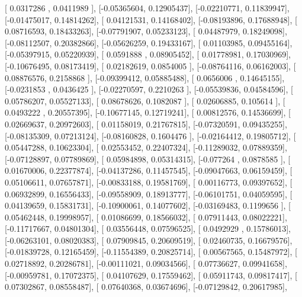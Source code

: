 \documentclass{article}
\begin{document}
       [ 0.0317286 ,  0.0411989 ],
       [-0.05365604,  0.12905437],
       [-0.02210771,  0.11839947],
       [-0.01475017,  0.14814262],
       [ 0.04121531,  0.14168402],
       [-0.08193896,  0.17688948],
       [ 0.08716593,  0.18433263],
       [-0.07791907,  0.05233123],
       [ 0.04487979,  0.18249098],
       [-0.08112507,  0.20382866],
       [-0.05626259,  0.19433167],
       [ 0.01103985,  0.09455164],
       [-0.05397915,  0.05220939],
       [ 0.0591888 ,  0.08905452],
       [ 0.01778981,  0.17030969],
       [-0.10676495,  0.08173419],
       [ 0.02182619,  0.0854005 ],
       [-0.08764116,  0.06162003],
       [ 0.08876576,  0.2158868 ],
       [-0.09399412,  0.05885488],
       [ 0.0656006 ,  0.14645155],
       [-0.0231853 ,  0.0436425 ],
       [-0.02270597,  0.2210263 ],
       [-0.05539836,  0.04584596],
       [ 0.05786207,  0.05527133],
       [ 0.08678626,  0.1082087 ],
       [ 0.02606885,  0.105614  ],
       [ 0.0493222 ,  0.20557395],
       [-0.10677145,  0.12719241],
       [ 0.00812576,  0.14536699],
       [ 0.02669637,  0.20972603],
       [ 0.01158019,  0.21767815],
       [-0.07320591,  0.09435255],
       [-0.08135309,  0.07213124],
       [-0.08160828,  0.1604476 ],
       [-0.02164412,  0.19805712],
       [ 0.05447288,  0.10623304],
       [ 0.02553452,  0.22407324],
       [-0.11289032,  0.07889359],
       [-0.07128897,  0.07789869],
       [ 0.05984898,  0.05314315],
       [-0.077264  ,  0.0878585 ],
       [ 0.01670006,  0.22377874],
       [-0.04137286,  0.11457545],
       [-0.09047663,  0.06159459],
       [ 0.05106611,  0.07657871],
       [-0.00833188,  0.19581769],
       [ 0.00116773,  0.09397652],
       [ 0.06932899,  0.16556433],
       [-0.09558909,  0.18913777],
       [-0.06101751,  0.04059595],
       [ 0.04139659,  0.15831731],
       [-0.10900061,  0.14077602],
       [-0.03169483,  0.1199656 ],
       [ 0.05462448,  0.19998957],
       [ 0.01086699,  0.18566032],
       [ 0.07911443,  0.08022221],
       [-0.11717667,  0.04801304],
       [ 0.03556448,  0.07596525],
       [ 0.0492929 ,  0.15786013],
       [-0.06263101,  0.08020383],
       [ 0.07909845,  0.20609519],
       [ 0.02460735,  0.16679576],
       [-0.01839728,  0.12165459],
       [-0.11554389,  0.20825714],
       [ 0.00567565,  0.15487972],
       [ 0.02718892,  0.20286781],
       [-0.00111021,  0.09034566],
       [ 0.07736627,  0.09941658],
       [-0.00959781,  0.17072375],
       [ 0.04107629,  0.17559462],
       [ 0.05911743,  0.09817417],
       [ 0.07302867,  0.08558487],
       [ 0.07640368,  0.03674696],
       [-0.07129842,  0.20617985],
\end{document}
